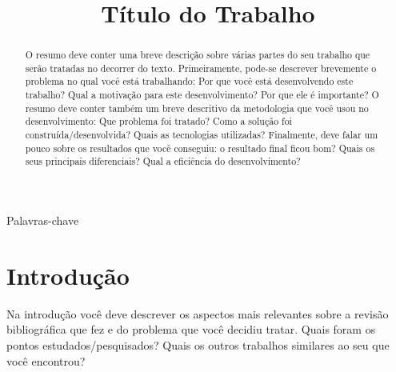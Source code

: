 \documentclass[twoside,conference,a4paper]{IEEEtran}
\begin{document}
\renewcommand{\IEEEkeywordsname}{Palavras-chave}


\title{Título do Trabalho}
\author{%
}


\maketitle

\begin{abstract}
 O resumo deve conter uma breve descrição sobre várias partes do seu trabalho que serão tratadas no decorrer do texto. Primeiramente, pode-se descrever brevemente o problema no qual você está trabalhando: Por que você está desenvolvendo este trabalho? Qual a motivação para este desenvolvimento? Por que ele é importante? O resumo deve conter também um breve descritivo da metodologia que você usou no desenvolvimento: Que problema foi tratado? Como a solução foi construída/desenvolvida? Quais as tecnologias utilizadas? Finalmente, deve falar um pouco sobre os resultados que você conseguiu: o resultado final ficou bom? Quais os seus principais diferenciais? Qual a eficiência do desenvolvimento?
\end{abstract}

\begin{IEEEkeywords}
 Palavras-chave
\end{IEEEkeywords}


\section{Introdução}

Na introdução você deve descrever os aspectos mais relevantes sobre a revisão bibliográfica que fez e do problema que você decidiu tratar. Quais foram os pontos estudados/pesquisados? Quais os outros trabalhos similares ao seu que você encontrou? 
\end{document}
